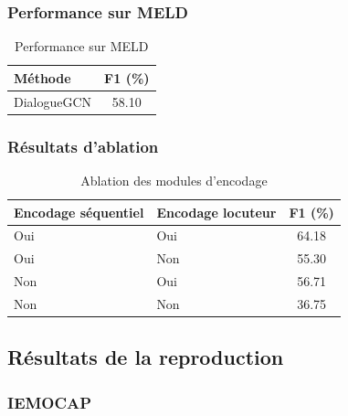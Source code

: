 \documentclass[a4paper,11pt]{article}
\begin{document}
\subsubsection{Performance sur MELD}
\begin{table}[htbp]
  \centering
  \begin{tabular}{lc}
    \toprule
    Méthode & F1 (\%) \\
    \midrule
    DialogueGCN & 58.10 \\
    \bottomrule
  \end{tabular}
  \caption{Performance sur MELD \cite{ghosal2019dialoguegcn}}
  \label{tab:orig_meld}
\end{table}

\subsubsection{Résultats d'ablation}
\begin{table}[htbp]
  \centering
  \begin{tabular}{llc}
    \toprule
    Encodage séquentiel & Encodage locuteur & F1 (\%) \\
    \midrule
    Oui & Oui & 64.18 \\
    Oui & Non & 55.30 \\
    Non & Oui & 56.71 \\
    Non & Non & 36.75 \\
    \bottomrule
  \end{tabular}
  \caption{Ablation des modules d'encodage \cite{ghosal2019dialoguegcn}}
  \label{tab:orig_ablate_enc}
\end{table}

\subsection{Résultats de la reproduction}

\subsubsection{IEMOCAP}
\end{document}
